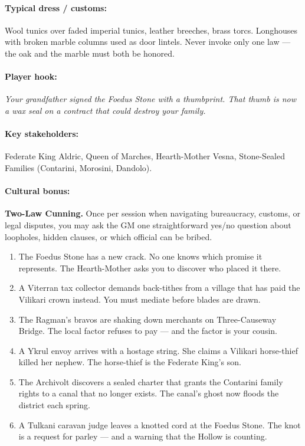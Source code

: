\paragraph{Typical dress / customs:} Wool tunics over faded imperial tunics, leather breeches, brass torcs. Longhouses with broken marble columns used as door lintels. Never invoke only one law --- the oak and the marble must both be honored.

\paragraph{Player hook:} \emph{Your grandfather signed the Foedus Stone with a thumbprint. That thumb is now a wax seal on a contract that could destroy your family.}

\paragraph{Key stakeholders:} Federate King Aldric, Queen of Marches, Hearth-Mother Vesna, Stone-Sealed Families (Contarini, Morosini, Dandolo).

\paragraph{Cultural bonus:} \textbf{Two-Law Cunning.} Once per session when navigating bureaucracy, customs, or legal disputes, you may ask the GM one straightforward yes/no question about loopholes, hidden clauses, or which official can be bribed.

\begin{tcolorbox}[colback=gray!5!white, colframe=gray!70!black, title=Vilikari Mini-Generator (d6),breakable]
\begin{enumerate}
\item The Foedus Stone has a new crack. No one knows which promise it represents. The Hearth-Mother asks you to discover who placed it there.
\item A Viterran tax collector demands back-tithes from a village that has paid the Vilikari crown instead. You must mediate before blades are drawn.
\item The Ragman's bravos are shaking down merchants on Three-Causeway Bridge. The local factor refuses to pay --- and the factor is your cousin.
\item A Ykrul envoy arrives with a hostage string. She claims a Vilikari horse-thief killed her nephew. The horse-thief is the Federate King's son.
\item The Archivolt discovers a sealed charter that grants the Contarini family rights to a canal that no longer exists. The canal's ghost now floods the district each spring.
\item A Tulkani caravan judge leaves a knotted cord at the Foedus Stone. The knot is a request for parley --- and a warning that the Hollow is counting.
\end{enumerate}
\end{tcolorbox}

